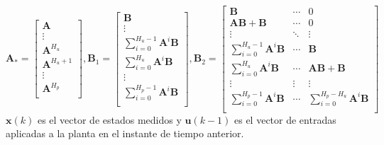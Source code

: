 \begin{equation}
    \mathbf{A}_*=\left[\begin{array}{c}
  \mathbf{A} \\
  \vdots \\
  \mathbf{A}^{H_u} \\
  \mathbf{A}^{H_u+1} \\
  \vdots \\
  \mathbf{A}^{H_p} \\
\end{array}
\right], \mathbf{B}_1=\left[\begin{array}{c}
 \mathbf{B} \\
  \vdots \\
  \sum_{i=0}^{H_u-1}\mathbf{A}^{i}\mathbf{B} \\
  \sum_{i=0}^{H_u}\mathbf{A}^{i}\mathbf{B} \\
  \vdots \\
  \sum_{i=0}^{H_p-1}\mathbf{A}^{i}\mathbf{B} \\
\end{array}
\right], \mathbf{B}_2=\left[
\begin{array}{ccc}
  \mathbf{B}                                 & \cdots & 0\\
  \mathbf{AB+B}                              & \cdots & 0\\
  \vdots                                     & \ddots & \vdots\\
  \sum_{i=0}^{H_u-1}\mathbf{A}^{i}\mathbf{B} & \cdots & \mathbf{B}\\
  \sum_{i=0}^{H_u}\mathbf{A}^{i}\mathbf{B}   & \cdots & \mathbf{AB+B}\\
  \vdots                                     & \vdots & \vdots\\
  \sum_{i=0}^{H_p-1}\mathbf{A}^{i}\mathbf{B} & \cdots & \sum_{i=0}^{H_p-H_u}\mathbf{A}^{i}\mathbf{B}\\
\end{array}
\right]
\end{equation}
$\mathbf{x}(k)$ es el vector de estados medidos y $\mathbf{u}(k-1)$ es el vector de entradas aplicadas a la
planta en el instante de tiempo anterior.

